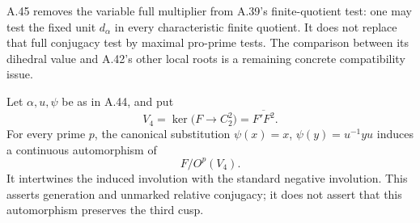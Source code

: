 A.45 removes the variable full multiplier
from A.39's finite-quotient test: one may
test the fixed unit \(d_\alpha\) in every
characteristic finite quotient. It does not
replace that full conjugacy test by maximal
pro-prime tests. The comparison between its
dihedral value and A.42's other local roots
is a remaining concrete compatibility issue.

Let \(\alpha,u,\psi\) be as in A.44, and put
\[
 V_4=\ker\bigl(F\longrightarrow C_2^2\bigr)
        =\overline{F'F^2}.
\]
For every prime \(p\), the canonical substitution
\(\psi(x)=x\), \(\psi(y)=u^{-1}yu\) induces a
continuous automorphism of
\[
                         F/O^p(V_4).
 \tag{A.46.1}
\]
It intertwines the induced involution with the standard
negative involution. This asserts generation and unmarked
relative conjugacy; it does not assert that this automorphism
preserves the third cusp.

